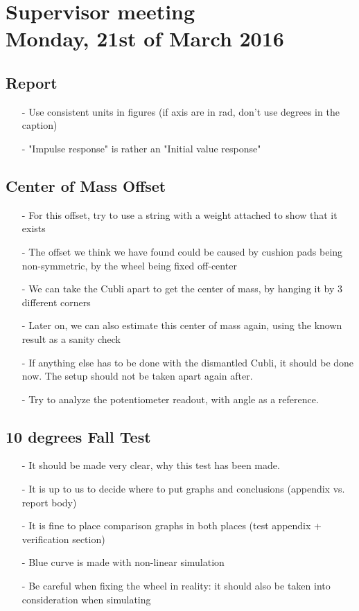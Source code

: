 

\renewcommand\chaptername{KAPITEL}
\renewcommand\contentsname{Indhold}
\renewcommand\figurename{Figur}
\renewcommand\tablename{Tabel}

\section*{Supervisor meeting\\ \small Monday, 21st of March 2016}

\subsection{Report}
\begin{itemize}
  \item[-] Use consistent units in figures (if axis are in rad, don't use degrees in the caption)
  \item[-] "Impulse response" is rather an "Initial value response"
\end{itemize}

\subsection{Center of Mass Offset}
\begin{itemize}
  \item[-] For this offset, try to use a string with a weight attached to show that it exists
  \item[-] The offset we think we have found could be caused by cushion pads being non-symmetric, by the wheel being fixed off-center
  \item[-] We can take the Cubli apart to get the center of mass, by hanging it by 3 different corners
  \item[-] Later on, we can also estimate this center of mass again, using the known result as a sanity check
  \item[-] If anything else has to be done with the dismantled Cubli, it should be done now. The setup should not be taken apart again after.
  \item[-] Try to analyze the potentiometer readout, with angle as a reference.
\end{itemize}

\subsection{10 degrees Fall Test}
\begin{itemize}
  \item[-] It should be made very clear, why this test has been made.
  \item[-] It is up to us to decide where to put graphs and conclusions (appendix vs. report body)
  \item[-] It is fine to place comparison graphs in both places (test appendix + verification section)
  \item[-] Blue curve is made with non-linear simulation
  \item[-] Be careful when fixing the wheel in reality: it should also be taken into consideration when simulating
\end{itemize}

